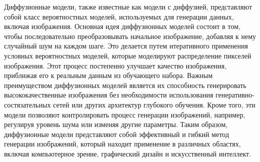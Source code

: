 Диффузионные модели, также известные как модели с диффузией, представляют собой класс вероятностных моделей, используемых для генерации данных, включая изображения.
Основная идея диффузионных моделей состоит в том, чтобы последовательно преобразовывать начальное изображение, добавляя к нему случайный шум на каждом шаге. Это делается путем итеративного применения условных вероятностных моделей, которые моделируют распределение пикселей изображения. Этот процесс постепенно улучшает качество изображения, приближая его к реальным данным из обучающего набора.
Важным преимуществом диффузионных моделей является их способность генерировать высококачественные изображения без необходимости использования генеративно-состязательных сетей или других архитектур глубокого обучения. Кроме того, эти модели позволяют контролировать процесс генерации изображений, например, регулируя уровень шума или изменяя другие параметры.
Таким образом, диффузионные модели представляют собой эффективный и гибкий метод генерации изображений, который находит применение в различных областях, включая компьютерное зрение, графический дизайн и искусственный интеллект.
